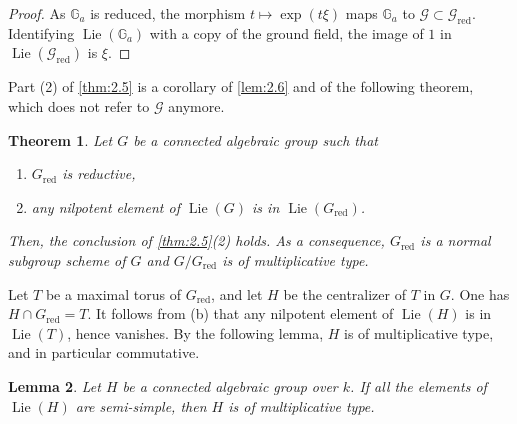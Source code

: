 \documentclass[11pt,a4paper]{article}
\theoremstyle{plain}
\newtheorem{theorem}{Theorem}[section]
\newtheorem{lemma}[theorem]{Lemma}
\theoremstyle{definition}
\DeclareMathOperator{\Lie}{Lie}
\newcommand{\G}{\mathbb{G}}
\newcommand{\red}{\mathrm{red}}
\begin{document}
\begin{proof}
As $\G_a$ is reduced, the morphism $t \mapsto \exp(t\xi)$ maps $\G_a$ to $\mathcal{G} \subset \mathcal{G}_\red$. Identifying $\Lie(\G_a)$ with a copy of the ground field, the image of $1$ in $\Lie(\mathcal{G}_\red)$ is $\xi$. \qedhere
\end{proof}

Part (2) of \ref{thm:2.5} is a corollary of \ref{lem:2.6} and of the following theorem, which does not refer to $\mathcal{G}$ anymore.

\begin{theorem} \label{thm:2.7}
Let $G$ be a connected algebraic group such that
\begin{enumerate}
\item[(a)] $G_\red$ is reductive,
\item[(b)] any nilpotent element of $\Lie(G)$ is in $\Lie(G_\red)$.
\end{enumerate}
Then, the conclusion of \ref{thm:2.5}(2) holds. As a consequence, $G_\red$ is a normal subgroup scheme of $G$ and $G/G_\red$ is of multiplicative type.
\end{theorem}

Let $T$ be a maximal torus of $G_\red$, and let $H$ be the centralizer of $T$ in $G$. One has $H \cap G_\red = T$. It follows from (b) that any nilpotent element of $\Lie(H)$ is in $\Lie(T)$, hence vanishes. By the following lemma, $H$ is of multiplicative type, and in particular commutative.

\begin{lemma} \label{lem:2.8}
Let $H$ be a connected algebraic group over $k$. If all the elements of $\Lie(H)$ are semi-simple, then $H$ is of multiplicative type.
\end{lemma}
\end{document}
